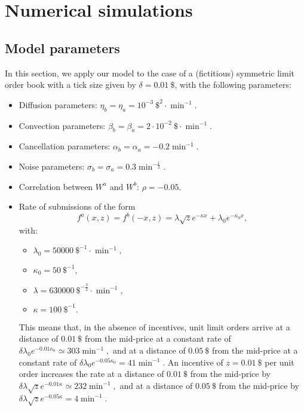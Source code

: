 \documentclass[11pt]{article}
\begin{document}
\section{Numerical simulations}\label{sec_numerical}
\subsection{Model parameters}

In this section, we apply our model to the case of a (fictitious) symmetric limit order book with a tick size given by $\delta = 0.01\ \$$, with the following parameters:
\begin{itemize}
    \item Diffusion parameters: $\eta_b = \eta_a = 10^{-3}\ \$^2 \cdot \min^{-1}$.
    \item Convection parameters: $\beta_b = \beta_a = 2 \cdot 10^{-2}\ \$ \cdot \min^{-1}$.
    \item Cancellation parameters: $\alpha_b = \alpha_a = -0.2 \min^{-1}$.
    \item Noise parameters: $\sigma_b = \sigma_a = 0.3 \min^{-\frac 12}$.
    \item Correlation between $W^a$ and $W^b$: $\rho = -0.05$.
    \item Rate of submissions of the form
    $$f^a(x,z) = f^b(-x,z) = \lambda \sqrt{z} e^{-\kappa x } + \lambda_0 e^{-\kappa_0 x}, $$
    with:
    \begin{itemize}
        \item[] $\lambda_0 = 50000\ \$^{-1} \cdot \min^{-1},$
        \item[] $\kappa_0 = 50\ \$^{-1},$
        \item[] $\lambda = 630000\ \$^{-\frac 32} \cdot \min^{-1},$
        \item[] $\kappa = 100\ \$^{-1}.$
    \end{itemize}
    This means that, in the absence of incentives, unit limit orders arrive at a distance of $0.01\ \$$ from the mid-price at a constant rate of $\delta \lambda_0 e^{-0.01 \kappa_0 } \simeq 303 \min^{-1}, $ and at a distance of $0.05\ \$$ from the mid-price at a constant rate of $\delta \lambda_0 e^{-0.05 \kappa_0 } = 41 \min^{-1}.$ An incentive of $z=0.01\ \$$ per unit order increases the rate at a distance of $0.01\ \$$ from the mid-price by $\delta \lambda \sqrt{z} e^{-0.01 \kappa } \simeq 232 \min^{-1}, $ and at a distance of $0.05\ \$$ from the mid-price by $\delta \lambda \sqrt{z} e^{-0.05 \kappa } = 4 \min^{-1}.$
\end{itemize}
\end{document}
